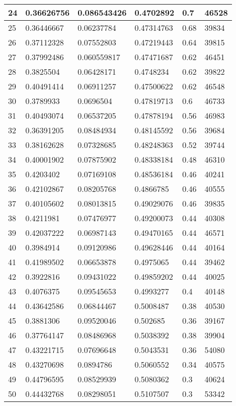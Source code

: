 \begin{longtable}{|l|l|l|l|l|l|}
24 & 0.36626756 & 0.086543426 & 0.4702892 & 0.7 & 46528 \\ \hline 
25 & 0.36446667 & 0.06237784 & 0.47314763 & 0.68 & 39834 \\ \hline 
26 & 0.37112328 & 0.07552803 & 0.47219443 & 0.64 & 39815 \\ \hline 
27 & 0.37992486 & 0.060559817 & 0.47471687 & 0.62 & 46451 \\ \hline 
28 & 0.3825504 & 0.06428171 & 0.4748234 & 0.62 & 39822 \\ \hline 
29 & 0.40491414 & 0.06911257 & 0.47500622 & 0.62 & 46548 \\ \hline 
30 & 0.3789933 & 0.0696504 & 0.47819713 & 0.6 & 46733 \\ \hline 
31 & 0.40493074 & 0.06537205 & 0.47878194 & 0.56 & 46983 \\ \hline 
32 & 0.36391205 & 0.08484934 & 0.48145592 & 0.56 & 39684 \\ \hline 
33 & 0.38162628 & 0.07328685 & 0.48248363 & 0.52 & 39744 \\ \hline 
34 & 0.40001902 & 0.07875902 & 0.48338184 & 0.48 & 46310 \\ \hline 
35 & 0.4203402 & 0.07169108 & 0.48536184 & 0.46 & 40241 \\ \hline 
36 & 0.42102867 & 0.08205768 & 0.4866785 & 0.46 & 40555 \\ \hline 
37 & 0.40105602 & 0.08013815 & 0.49029076 & 0.46 & 39835 \\ \hline 
38 & 0.4211981 & 0.07476977 & 0.49200073 & 0.44 & 40308 \\ \hline 
39 & 0.42037222 & 0.06987143 & 0.49470165 & 0.44 & 46571 \\ \hline 
40 & 0.3984914 & 0.09120986 & 0.49628446 & 0.44 & 40164 \\ \hline 
41 & 0.41989502 & 0.06653878 & 0.4975065 & 0.44 & 39462 \\ \hline 
42 & 0.3922816 & 0.09431022 & 0.49859202 & 0.44 & 40025 \\ \hline 
43 & 0.4076375 & 0.09545653 & 0.4993277 & 0.4 & 40148 \\ \hline 
44 & 0.43642586 & 0.06844467 & 0.5008487 & 0.38 & 40530 \\ \hline 
45 & 0.3881306 & 0.09520046 & 0.502685 & 0.36 & 39167 \\ \hline 
46 & 0.37764147 & 0.08486968 & 0.5038392 & 0.38 & 39904 \\ \hline 
47 & 0.43221715 & 0.07696648 & 0.5043531 & 0.36 & 54080 \\ \hline 
48 & 0.43270698 & 0.0894786 & 0.5060552 & 0.34 & 40575 \\ \hline 
49 & 0.44796595 & 0.08529939 & 0.5080362 & 0.3 & 40624 \\ \hline 
50 & 0.44432768 & 0.08298051 & 0.5107507 & 0.3 & 53342 \\ \hline 
\end{longtable}